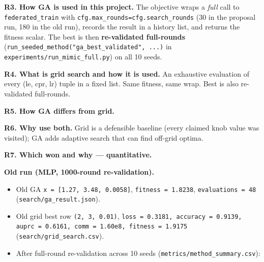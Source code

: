 \documentclass{article}
\begin{document}
\textbf{R3. How GA is used in this project.} The objective wraps a \emph{full} call to \texttt{federated\_train} with \texttt{cfg.max\_rounds=cfg.search\_rounds} (30 in the proposal run, 180 in the old run), records the result in a history list, and returns the fitness scalar. The best is then \textbf{re-validated full-rounds} (\texttt{run\_seeded\_method("ga\_best\_validated", ...)} in \texttt{experiments/run\_mimic\_full.py}) on all 10 seeds.


\textbf{R4. What is grid search and how it is used.} An exhaustive evaluation of every (le, cpr, lr) tuple in a fixed list. Same fitness, same wrap. Best is also re-validated full-rounds.


\textbf{R5. How GA differs from grid.}


\begin{table}[H]
  \centering
  \small
\end{table}


\textbf{R6. Why use both.} Grid is a defensible baseline (every claimed knob value was visited); GA adds adaptive search that can find off-grid optima.


\textbf{R7. Which won and why --- quantitative.}


\textbf{Old run (MLP, 1000-round re-validation).}

\begin{itemize}[leftmargin=1.4em,itemsep=2pt,topsep=2pt]
  \item Old GA \texttt{x = [1.27, 3.48, 0.0058]}, \texttt{fitness = 1.8238}, \texttt{evaluations = 48} (\texttt{search/ga\_result.json}).
  \item Old grid best row \texttt{(2, 3, 0.01)}, \texttt{loss = 0.3181, accuracy = 0.9139, auprc = 0.6161, comm = 1.60e8, fitness = 1.9175} (\texttt{search/grid\_search.csv}).
  \item After full-round re-validation across 10 seeds (\texttt{metrics/method\_summary.csv}):
\end{itemize}
\end{document}

